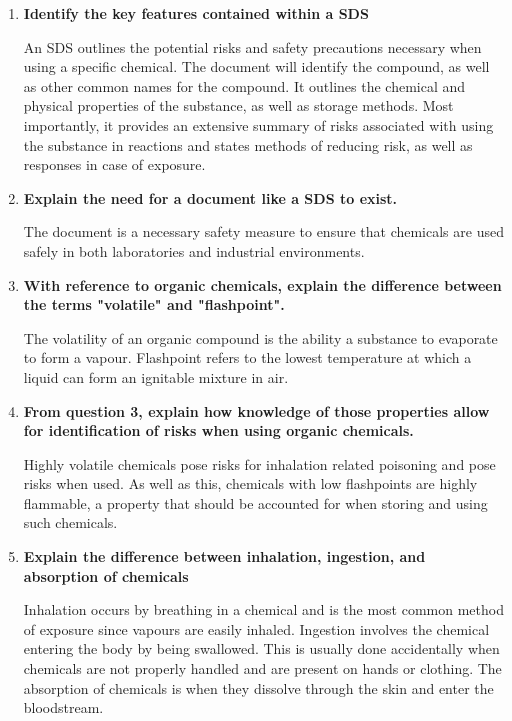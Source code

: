 \documentclass{report}
\begin{document}
	\begin{enumerate}
		\item \textbf{Identify the key features contained within a SDS}

			An SDS outlines the potential risks and safety precautions necessary when using a specific chemical. The document will identify the compound, as well as other common names for the compound. It outlines the chemical and physical properties of the substance, as well as storage methods. Most importantly, it provides an extensive summary of risks associated with using the substance in reactions and states methods of reducing risk, as well as responses in case of exposure.

		\item \textbf{Explain the need for a document like a SDS to exist.}

			The document is a necessary safety measure to ensure that chemicals are used safely in both laboratories and industrial environments.
			
		\item \textbf{With reference to organic chemicals, explain the difference between the terms "volatile" and "flashpoint".}

			The volatility of an organic compound is the ability a substance to evaporate to form a vapour. Flashpoint refers to the lowest temperature at which a liquid can form an ignitable mixture in air.

		\item \textbf{From question 3, explain how knowledge of those properties allow for identification of risks when using organic chemicals.}

			Highly volatile chemicals pose risks for inhalation related poisoning and pose risks when used. As well as this, chemicals with low flashpoints are highly flammable, a property that should be accounted for when storing and using such chemicals.

		\item \textbf{Explain the difference between inhalation, ingestion, and absorption of chemicals}

			Inhalation occurs by breathing in a chemical and is the most common method of exposure since vapours are easily inhaled. Ingestion involves the chemical entering the body by being swallowed. This is usually done accidentally when chemicals are not properly handled and are present on hands or clothing. The absorption of chemicals is when they dissolve through the skin and enter the bloodstream.


\end{enumerate}
\end{document}
